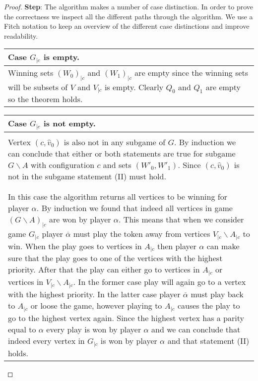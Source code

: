 \begin{theorem}
\begin{proof}
	\textbf{Step}: The algorithm makes a number of case distinction. In order to prove the correctness we inspect all the different paths through the algorithm. We use a Fitch notation to keep an overview of the different case distinctions and improve readability.\\
	\begin{longtable}{|p{15.2cm}}
		Case $G_{|c}$ is empty.\\
		\hline
		Winning sets $(W_0)_{|c}$ and $(W_1)_{|c}$ are empty since the winning sets will be subsets of $V$ and $V_{|c}$ is empty. Clearly $Q_0$ and $Q_1$ are empty so the theorem holds.
	\end{longtable}
	\begin{longtable}{|p{15.2cm}}
		Case $G_{|c}$ is not empty.\\
		\hline
		\begin{tabular}{|p{15cm}}
			Case $(c,\hat{v}_0) \notin V$\\
			\hline
			Vertex $(c,\hat{v}_0)$ is also not in any subgame of $G$. By induction we can conclude that either or both statements are true for subgame $G\backslash A$ with configuration $c$ and sets $(W'_0,W'_1)$. Since $(c,\hat{v}_0)$ is not in the subgame statement (II) must hold.\\\\
			\begin{tabular}{|p{14.8cm}}
				Case $W'_{\overline{\alpha}} = \emptyset$\\
				\hline
				In this case the algorithm returns all vertices to be winning for player $\alpha$. By induction we found that indeed all vertices in game $(G\backslash A)_{|c}$ are won by player $\alpha$. This means that when we consider game $G_{|c}$ player $\overline{\alpha}$ must play the token away from vertices $V_{|c} \backslash A_{|c}$ to win. When the play goes to vertices in $A_{|c}$ then player $\alpha$ can make sure that the play goes to one of the vertices with the highest priority. After that the play can either go to vertices in $A_{|c}$ or vertices in $V_{|c} \backslash A_{|c}$. In the former case play will again go to a vertex with the highest priority. In the latter case player $\overline{\alpha}$ must play back to $A_{|c}$ or loose the game, however playing to $A_{|c}$ causes the play to go to the highest vertex again. Since the highest vertex has a parity equal to $\alpha$ every play is won by player $\alpha$ and we can conclude that indeed every vertex in $G_{|c}$ is won by player $\alpha$ and that statement (II) holds.
			\end{tabular}

\end{tabular}
\end{longtable}
\end{proof}
\end{theorem}
